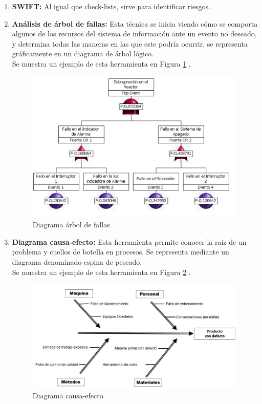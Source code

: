 \begin{enumerate}
\item {\bfseries SWIFT:}
Al igual que check-lists, sirve para identificar riesgos.
\item {\bfseries Análisis de árbol de fallas:}
Esta técnica se inicia viendo cómo se comporta algunos de los recursos del sistema de información ante un evento no deseado, y determina todas las maneras en las que este podría ocurrir, se representa gráficamente en un diagrama de árbol lógico.\\
Se muestra un ejemplo de esta herramienta en Figura \ref{img:diagrama_arbol_de_fallas} \cite{daf}.
\begin{figure}[tphb]
  		   \centering
     		   \includegraphics[width=5in]{diagrama-arbol-fallas.png}
  		   \caption{Diagrama árbol de fallas}
  		   \label{img:diagrama_arbol_de_fallas}
\end{figure}
\item {\bfseries Diagrama causa-efecto:}
Esta herramienta permite conocer la raíz de un problema y cuellos de botella en procesos. Se representa mediante un diagrama denominado espina de pescado.\\
Se muestra un ejemplo de esta herramienta en Figura \ref{img:diagrama_causa_efecto} \cite{diagrama-pescado}.
\begin{figure}[tphb]
  		   \centering
     		   \includegraphics[width=5in]{diagrama-causa-efecto.jpg}
  		   \caption{Diagrama causa-efecto}
  		   \label{img:diagrama_causa_efecto}
\end{figure}


\end{enumerate}
